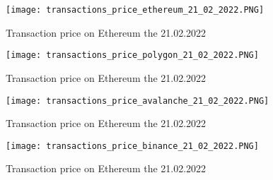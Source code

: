 \documentclass[a4paper,11pt,oneside]{report}
\begin{document}
\begin{center}
\begin{figure}[h!] 
  \texttt{[image: transactions\_price\_ethereum\_21\_02\_2022.PNG]}
  \caption{Transaction price on Ethereum the 21.02.2022}
  \label{fig:transactions_price_ethereum_21_02_2022}
\end{figure}
\end{center}

\begin{center}
\begin{figure}[h!] 
  \texttt{[image: transactions\_price\_polygon\_21\_02\_2022.PNG]}
  \caption{Transaction price on Ethereum the 21.02.2022}
  \label{fig:transactions_price_polygon_21_02_2022}
\end{figure}
\end{center}

\begin{center}
\begin{figure}[h!] 
  \texttt{[image: transactions\_price\_avalanche\_21\_02\_2022.PNG]}
  \caption{Transaction price on Ethereum the 21.02.2022}
  \label{fig:transactions_price_avalanche_21_02_2022}
\end{figure}
\end{center}

\begin{center}
\begin{figure}[h!] 
  \texttt{[image: transactions\_price\_binance\_21\_02\_2022.PNG]}
  \caption{Transaction price on Ethereum the 21.02.2022}
  \label{fig:transactions_price_binance_21_02_2022}
\end{figure}
\end{center}
\end{document}
